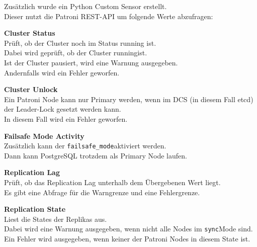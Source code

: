 \begin{flushleft}
    Zusätzlich wurde ein Python Custom Sensor erstellt.\\
    Dieser nutzt die Patroni REST-API um folgende Werte abzufragen:
    \begin{description}
        \item \textbf{Cluster Status}\hfill \\Prüft, ob der Cluster noch im Status running ist.\\Dabei wird geprüft, ob der Cluster \guillemotleft running\guillemotright ist.\\Ist der Cluster pausiert, wird eine Warnung ausgegeben.\\Andernfalls wird ein Fehler geworfen.
        \item \textbf{Cluster Unlock}\hfill \\Ein Patroni Node kann nur Primary werden, wenn im DCS (in diesem Fall \gls{etcd}) der Leader-Lock gesetzt werden kann.\\In diesem Fall wird ein Fehler geworfen.
        \item \textbf{Failsafe Mode Activity}\hfill \\Zusätzlich kann der \guillemotleft\texttt{failsafe\_mode}\guillemotright aktiviert werden.\\Dann kann \Gls{PostgreSQL} trotzdem als Primary Node laufen\cite{KFMY83EB}.
        \item \textbf{Replication Lag}\hfill \\Prüft, ob das Replication Lag unterhalb dem Übergebenen Wert liegt.\\Es gibt eine Abfrage für die Warngrenze und eine Fehlergrenze.
        \item \textbf{Replication State}\hfill \\Liest die States der Replikas aus.\\Dabei wird eine Warnung ausgegeben, wenn nicht alle Nodes im \guillemotleft\texttt{sync}\guillemotright Mode sind.\\Ein Fehler wird ausgegeben, wenn keiner der Patroni Nodes in diesem State ist.
    \end{description}
\end{flushleft}

